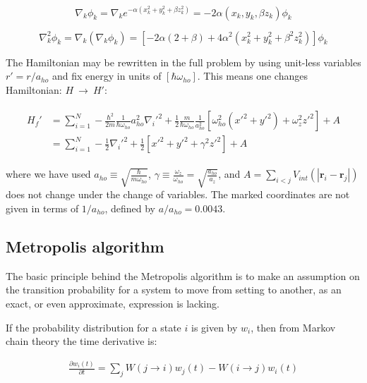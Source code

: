\documentclass[english, a4paper]{article}
\newcommand{\bm}[1]{\mathbf{#1}}
\begin{document}
\begin{equation}
	\nabla_k\phi_k = \nabla_k e^{-\alpha(x_k^2 + y_k^2 + \beta z_k^2)} = -2\alpha(x_k,y_k,\beta z_k)\phi_k
\end{equation}

\begin{equation}
\nabla_k^2\phi_k = \nabla_k (\nabla_k\phi_k) = \left[-2\alpha(2+\beta) + 4\alpha^2(x_k^2 + y_k^2 + \beta^2 z_k^2)\right]\phi_k
\end{equation}

The Hamiltonian may be rewritten in the full problem by using unit-less variables $r' = r/a_{ho}$ and fix energy in units of $[\hbar\omega_{ho}]$. This means one changes Hamiltonian: $H\:\rightarrow\: H'$:

\begin{align}
	\begin{split}
	H_f' &= \sum_{i=1}^{N}-\frac{\hbar^2}{2m} \frac{1}{\hbar\omega_{ho}}a_{ho}^2\nabla_i'^2 + \frac{1}{2}\frac{m}{\hbar\omega_{ho}}\frac{1}{a_{ho}^2}\left[ \omega_{ho}^2(x'^2+y'^2) + \omega_z^2z'^2 \right] + A\\
	&= \sum_{i=1}^{N}-\frac{1}{2}\nabla_i'^2 + \frac{1}{2}\left[ x'^2+y'^2 + \gamma^2z'^2 \right] + A
	\end{split}
\end{align}

where we have used $a_{ho} \equiv \sqrt{\frac{\hbar}{m\omega_{ho}}}$, $\gamma \equiv \frac{\omega_z}{\omega_{ho}} = \sqrt{\frac{a_{ho}}{a_z}}$, and $A = \sum_{i<j} V_{int}(|\bm{r}_i-\bm{r}_j|)$ does not change under the change of variables. The marked coordinates are not given in terms of $1/a_{ho}$, defined by $a/a_{ho} = 0.0043$.

\subsection{Metropolis algorithm}
The basic principle behind the Metropolis algorithm is to make an assumption on the transition probability for a system to move from setting to another, as
an exact, or even approximate, expression is lacking.

If the probability distribution for a state $i$ is given by $w_i$, then from Markov chain theory the time derivative is:

\begin{align}
 \frac{\partial w_i(t)}{\partial t} = \sum_j W(j\rightarrow i)w_j(t) - W(i\rightarrow j)w_i(t)
\end{align}
\end{document}

